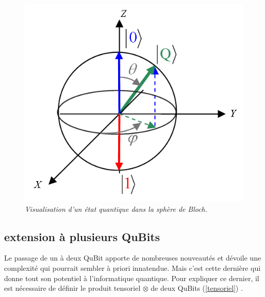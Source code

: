 \documentclass[a4paper,12pt]{report}
\newcommand{\para}[1]{\par{#1}\\}
\begin{document}
\begin{figure}
	\begin{center}
		\includegraphics[scale=0.60]{images/bloch}
	\end{center}
	\caption{\textit{Visualisation d'un état quantique dans la sphère de Bloch.}}
	\label{bloch}
\end{figure}

		\subsection{extension à plusieurs QuBits}

\para{
	Le passage de un à deux QuBit apporte de nombreuses nouveautés et dévoile une complexité qui pourrait sembler à priori innatendue. Mais c'est cette dernière qui donne tout son potentiel à l'informatique quantique. Pour expliquer ce dernier, il est nécessaire de définir le produit tensoriel $\otimes$ de deux QuBits (\ref{tensoriel}) .
}
\end{document}

